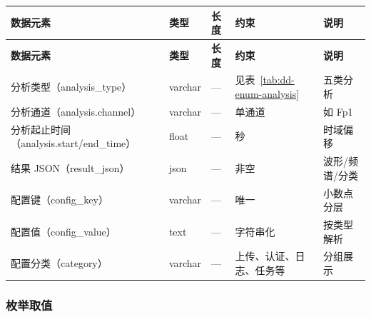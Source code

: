 {\small
\begin{longtable}{|p{32mm}|p{20mm}|p{16mm}|p{24mm}|p{42mm}|}
\hline
\textbf{数据元素} & \textbf{类型} & \textbf{长度} & \textbf{约束} & \textbf{说明}\\\hline
\endfirsthead
\hline
\textbf{数据元素} & \textbf{类型} & \textbf{长度} & \textbf{约束} & \textbf{说明}\\\hline
\endhead
分析类型（analysis\_type）& varchar & --- & 见表~\ref{tab:dd-enum-analysis} & 五类分析 \\ \hline
分析通道（analysis.channel）& varchar & --- & 单通道 & 如 Fp1 \\ \hline
分析起止时间（analysis.start/end\_time）& float & --- & 秒 & 时域偏移 \\ \hline
结果 JSON（result\_json）& json & --- & 非空 & 波形/频谱/分类 \\ \hline
配置键（config\_key）& varchar & --- & 唯一 & 小数点分层 \\ \hline
配置值（config\_value）& text & --- & 字符串化 & 按类型解析 \\ \hline
配置分类（category）& varchar & --- & 上传、认证、日志、任务等 & 分组展示 \\ \hline
\end{longtable}
}

\subsubsection{枚举取值}
\label{sec:dd-enum}

